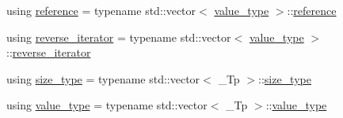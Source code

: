 \begin{DoxyCompactItemize}
\item 
using \hyperlink{class____gnu__cxx_1_1__Polynomial_accb3b4df60e4ad82d466173d54ea731a}{reference} = typename std\+::vector$<$ \hyperlink{class____gnu__cxx_1_1__Polynomial_a725563351f50e76084a7a016c06f8a53}{value\+\_\+type} $>$\+::\hyperlink{class____gnu__cxx_1_1__Polynomial_accb3b4df60e4ad82d466173d54ea731a}{reference}
\item 
using \hyperlink{class____gnu__cxx_1_1__Polynomial_aed8f7d97c575d5c34c54170631953415}{reverse\+\_\+iterator} = typename std\+::vector$<$ \hyperlink{class____gnu__cxx_1_1__Polynomial_a725563351f50e76084a7a016c06f8a53}{value\+\_\+type} $>$\+::\hyperlink{class____gnu__cxx_1_1__Polynomial_aed8f7d97c575d5c34c54170631953415}{reverse\+\_\+iterator}
\item 
using \hyperlink{class____gnu__cxx_1_1__Polynomial_a6afe219c123c7a2fdc5abac8a6639053}{size\+\_\+type} = typename std\+::vector$<$ \+\_\+\+Tp $>$\+::\hyperlink{class____gnu__cxx_1_1__Polynomial_a6afe219c123c7a2fdc5abac8a6639053}{size\+\_\+type}
\item 
using \hyperlink{class____gnu__cxx_1_1__Polynomial_a725563351f50e76084a7a016c06f8a53}{value\+\_\+type} = typename std\+::vector$<$ \+\_\+\+Tp $>$\+::\hyperlink{class____gnu__cxx_1_1__Polynomial_a725563351f50e76084a7a016c06f8a53}{value\+\_\+type}
\end{DoxyCompactItemize}
